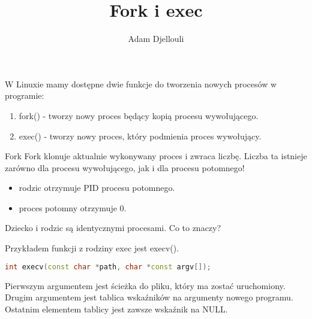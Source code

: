 \documentclass[notheorems, aspectratio=54]{beamer}
\title[Fork i exec]{Fork i exec}
\author{Adam Djellouli}
\begin{document}
\begin{frame}
    \titlepage
\end{frame}

\begin{frame}

W Linuxie mamy dostępne dwie funkcje do tworzenia nowych procesów w programie:

\begin{enumerate}
\item fork() - tworzy nowy proces będący kopią procesu wywołującego. 
\item exec() - tworzy nowy proces, który podmienia proces wywołujący.
\end{enumerate}

\end{frame}

\begin{frame}
Fork
Fork klonuje aktualnie wykonywany proces i zwraca liczbę. 
Liczba ta istnieje zarówno dla procesu wywołującego, jak i dla procesu potomnego!

\begin{itemize}
\item rodzic otrzymuje PID procesu potomnego.
\item proces potomny otrzymuje 0.
\end{itemize}

Dziecko i rodzic są identycznymi procesami. Co to znaczy?


Przykładem funkcji z rodziny exec jest execv().

\begin{lstlisting}[language=C++]
int execv(const char *path, char *const argv[]);
\end{lstlisting}

Pierwszym argumentem jest ścieżka do pliku, który ma zostać uruchomiony. 
Drugim argumentem jest tablica wskaźników na argumenty nowego programu.
Ostatnim elementem tablicy jest zawsze wskaźnik na NULL.
\end{frame}
\end{document}
